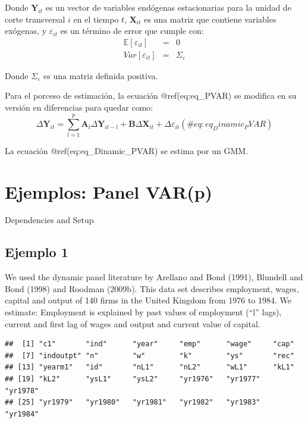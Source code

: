 \documentclass[
]{book}
\begin{document}
Donde \(\mathbf{Y}_{it}\) es un vector de variables endógenas estacionarias para la unidad de corte transversal \(i\) en el tiempo \(t\), \(\mathbf{X}_{it}\) es una matriz que contiene variables exógenas, y \(\varepsilon_{it}\) es un término de error que cumple con:
\begin{eqnarray*}
    \mathbb{E}[\varepsilon_{it}] & = & 0 \\
    Var[\varepsilon_{it}] & = & \Sigma_\varepsilon
\end{eqnarray*}

Donde \(\Sigma_\varepsilon\) es una matriz definida positiva.

Para el porceso de estimación, la ecuación @ref(eq:eq\_PVAR) se modifica en su versión en diferencias para quedar como:
\begin{equation}
    \Delta \mathbf{Y}_{it} = \sum_{l = 1}^p \mathbf{A}_l \Delta \mathbf{Y}_{i t - l} + \mathbf{B} \Delta \mathbf{X}_{it} + \Delta \varepsilon_{it}
    (\#eq:eq_Dinamic_PVAR)
\end{equation}

La ecuación @ref(eq:eq\_Dinamic\_PVAR) se estima por un GMM.

\hypertarget{ejemplos-panel-varp}{%
\section{Ejemplos: Panel VAR(p)}\label{ejemplos-panel-varp}}

Dependencies and Setup

\hypertarget{ejemplo-1}{%
\subsection{Ejemplo 1}\label{ejemplo-1}}

We used the dynamic panel literature by Arellano and Bond (1991), Blundell and Bond (1998) and Roodman (2009b).
This data set describes employment, wages, capital and output of 140 firms in the United Kingdom from 1976 to 1984.
We estimate: Employment is explained by past values of employment (``l'' lags), current and first lag of wages and output and current value of capital.

\begin{verbatim}
##  [1] "c1"       "ind"      "year"     "emp"      "wage"     "cap"     
##  [7] "indoutpt" "n"        "w"        "k"        "ys"       "rec"     
## [13] "yearm1"   "id"       "nL1"      "nL2"      "wL1"      "kL1"     
## [19] "kL2"      "ysL1"     "ysL2"     "yr1976"   "yr1977"   "yr1978"  
## [25] "yr1979"   "yr1980"   "yr1981"   "yr1982"   "yr1983"   "yr1984"
\end{verbatim}
\end{document}

